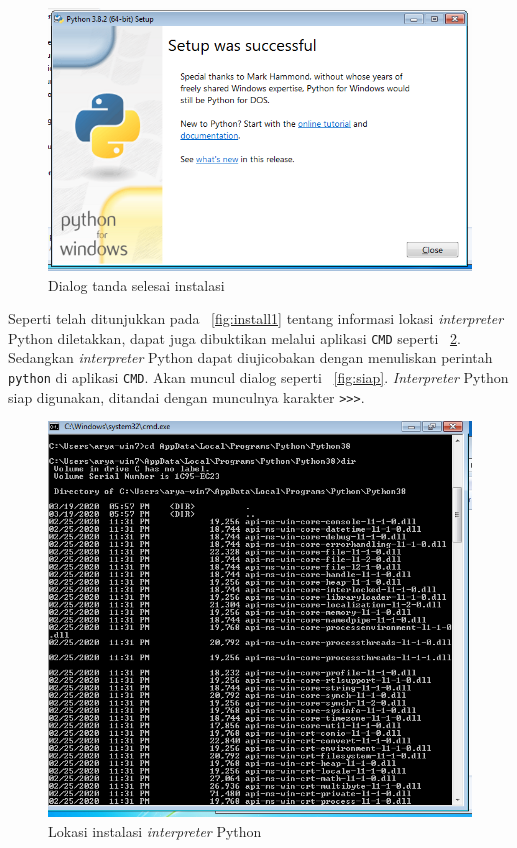 \begin{figure}[h!]
  \begin{center}
    \includegraphics[scale=.5]{pics/installFinished.png}
    \caption{Dialog tanda selesai instalasi}
    \label{fig:finish}
  \end{center}
\end{figure}

Seperti telah ditunjukkan pada \figurename~\ref{fig:install1} tentang informasi lokasi \textit{interpreter} Python diletakkan, dapat juga dibuktikan melalui aplikasi \texttt{CMD} seperti \figurename~\ref{fig:lokasi}. Sedangkan \textit{interpreter} Python dapat diujicobakan dengan menuliskan perintah \texttt{python} di aplikasi \texttt{CMD}. Akan muncul dialog seperti \figurename~\ref{fig:siap}. \textit{Interpreter} Python siap digunakan, ditandai dengan munculnya karakter \texttt{>>>}.

\begin{figure}[h!]
  \begin{center}
    \includegraphics[scale=.5]{pics/installedLocation.png}
    \caption{Lokasi instalasi \textit{interpreter} Python}
    \label{fig:lokasi}
  \end{center}
\end{figure}

